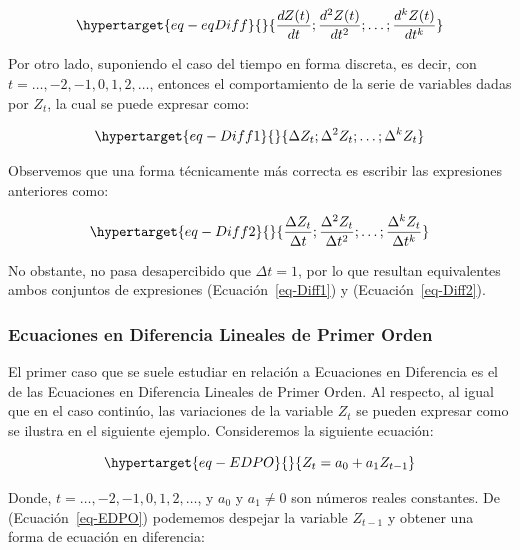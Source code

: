 \documentclass[
  a4paper,
]{article}
\begin{document}
\begin{equation}\protect\hypertarget{eq-eqDiff}{}{
\frac{dZ(t)}{dt}; \frac{d^2Z(t)}{dt^2}; \ldots; \frac{d^kZ(t)}{dt^k}
}\label{eq-eqDiff}\end{equation}

Por otro lado, suponiendo el caso del tiempo en forma discreta, es
decir, con \(t = \ldots, -2, -1, 0, 1, 2, \ldots\), entonces el
comportamiento de la serie de variables dadas por \(Z_t\), la cual se
puede expresar como:

\begin{equation}\protect\hypertarget{eq-Diff1}{}{
\Delta Z_t; \Delta^2 Z_t; \ldots; \Delta^k Z_t
}\label{eq-Diff1}\end{equation}

Observemos que una forma técnicamente más correcta es escribir las
expresiones anteriores como:

\begin{equation}\protect\hypertarget{eq-Diff2}{}{
\frac{\Delta Z_t}{\Delta t}; \frac{\Delta^2 Z_t}{\Delta t^2}; \ldots; \frac{\Delta^k Z_t}{\Delta t^k}
}\label{eq-Diff2}\end{equation}

No obstante, no pasa desapercibido que \(\Delta t = 1\), por lo que
resultan equivalentes ambos conjuntos de expresiones
(Ecuación~\ref{eq-Diff1}) y (Ecuación~\ref{eq-Diff2}).

\hypertarget{ecuaciones-en-diferencia-lineales-de-primer-orden}{%
\subsubsection{Ecuaciones en Diferencia Lineales de Primer
Orden}\label{ecuaciones-en-diferencia-lineales-de-primer-orden}}

El primer caso que se suele estudiar en relación a Ecuaciones en
Diferencia es el de las Ecuaciones en Diferencia Lineales de Primer
Orden. Al respecto, al igual que en el caso continúo, las variaciones de
la variable \(Z_t\) se pueden expresar como se ilustra en el siguiente
ejemplo. Consideremos la siguiente ecuación:

\begin{equation}\protect\hypertarget{eq-EDPO}{}{
Z_t = a_0 + a_1 Z_{t-1}
}\label{eq-EDPO}\end{equation}

Donde, \(t = \ldots, -2, -1, 0, 1, 2, \ldots\), y \(a_0\) y
\(a_1 \neq 0\) son números reales constantes. De
(Ecuación~\ref{eq-EDPO}) podememos despejar la variable \(Z_{t-1}\) y
obtener una forma de ecuación en diferencia:
\end{document}
